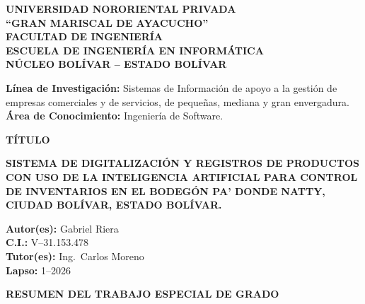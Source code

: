 \documentclass[12pt, letterpaper]{report}
\begin{document}
\restoregeometry

\clearpage
\begin{center}
{\fontsize{12}{14}\selectfont\bfseries
UNIVERSIDAD NORORIENTAL PRIVADA\\
``GRAN MARISCAL DE AYACUCHO''\\
FACULTAD DE INGENIERÍA\\
ESCUELA DE INGENIERÍA EN INFORMÁTICA\\
NÚCLEO BOLÍVAR -- ESTADO BOLÍVAR\par}
\end{center}

\vspace{3pt}

{\noindent
\textbf{Línea de Investigación:} Sistemas de Información de apoyo a
la gestión de empresas comerciales y de servicios, de pequeñas,
mediana y gran envergadura.\\
\textbf{Área de Conocimiento:} Ingeniería de Software.\par}

\vspace{5pt}

\begin{center}
{\fontsize{12}{14}\selectfont\bfseries TÍTULO\par}
\vspace{4pt}
{\fontsize{12}{14}\selectfont\bfseries
SISTEMA DE DIGITALIZACIÓN Y REGISTROS DE PRODUCTOS CON USO DE LA
INTELIGENCIA ARTIFICIAL PARA CONTROL DE INVENTARIOS EN EL
BODEGÓN PA' DONDE NATTY, CIUDAD BOLÍVAR, ESTADO BOLÍVAR.\par}
\end{center}

\vspace{4pt}

{\noindent
\textbf{Autor(es):} Gabriel Riera\\
\textbf{C.I.:} V--31.153.478\\
\textbf{Tutor(es):} Ing.\ Carlos Moreno\\
\textbf{Lapso:} 1--2026\par}

\vspace{5pt}

\begin{center}
{\fontsize{12}{14}\selectfont\bfseries
RESUMEN DEL TRABAJO ESPECIAL DE GRADO\par}
\end{center}
\end{document}
